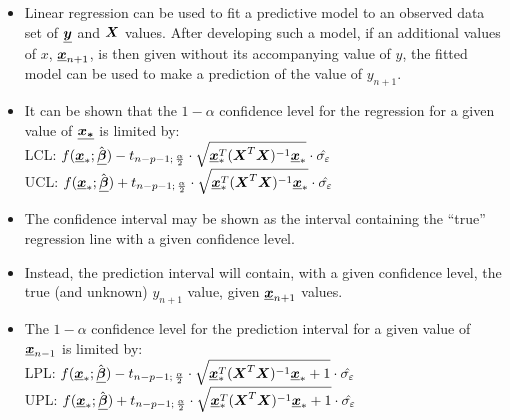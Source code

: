 
\begin{frame}
  \begin{itemize}
    \vspace{0.5cm}
    \item Linear regression can be used to fit a predictive model to an observed data set of $ \boldsymbol{\underline{y}} $ and $ \boldsymbol{X} $ values. After developing such a model, if an additional values of $ x $, $ \boldsymbol{\underline{x}}_{n+1} $, is then given without its accompanying value of $ y $, the fitted model can be used to make a prediction of the value of $ y_{n+1} $.
    \vspace{0.5cm}
    \item It can be shown that the $ 1-\alpha $ confidence level for the regression for a given value of $ \boldsymbol{\underline{x_*}} $ is limited by:\\
      LCL: $f(\boldsymbol{\underline{x}}_*;\hat{\boldsymbol{\underline{\beta}}})-t_{n-p-1;\,\frac{\alpha}{2}}\cdot \sqrt{\boldsymbol{\underline{x}}_*^T(\boldsymbol{X}^T\boldsymbol{X})^{-1}\boldsymbol{\underline{x}}_*}\cdot \hat{\sigma_\varepsilon}$ \\
      \vspace*{.1cm}
      UCL: $f(\boldsymbol{\underline{x}}_*;\hat{\boldsymbol{\underline{\beta}}})+t_{n-p-1;\,\frac{\alpha}{2}}\cdot \sqrt{\boldsymbol{\underline{x}}_*^T(\boldsymbol{X}^T\boldsymbol{X})^{-1}\boldsymbol{\underline{x}}_*}\cdot \hat{\sigma_\varepsilon}$ \\
      \vspace*{.1cm}
  \end{itemize}
\end{frame}

\begin{frame}
  \begin{itemize}
    \vspace{0.25cm}
    \item The confidence interval may be shown as the interval containing the ``true'' regression line with a given confidence level.
    \vspace{0.25cm}
    \item Instead, the prediction interval will contain, with a given confidence level, the true (and unknown) $ y_{n+1} $ value, given $ \boldsymbol{\underline{x}}_{n+1} $ values.
    \vspace{0.25cm}
    \item The $ 1-\alpha $ confidence level for the prediction interval for a given value of $ \boldsymbol{\underline{x}}_{n-1} $ is limited by:\\
      LPL: $f(\boldsymbol{\underline{x}}_*;\hat{\boldsymbol{\underline{\beta}}})-t_{n-p-1;\,\frac{\alpha}{2}}\cdot \sqrt{\boldsymbol{\underline{x}}_*^T(\boldsymbol{X}^T\boldsymbol{X})^{-1}\boldsymbol{\underline{x}}_*+1}\cdot \hat{\sigma_\varepsilon}$ \\
      \vspace*{.1cm}
      UPL: $f(\boldsymbol{\underline{x}}_*;\hat{\boldsymbol{\underline{\beta}}})+t_{n-p-1;\,\frac{\alpha}{2}}\cdot \sqrt{\boldsymbol{\underline{x}}_*^T(\boldsymbol{X}^T\boldsymbol{X})^{-1}\boldsymbol{\underline{x}}_*+1}\cdot \hat{\sigma_\varepsilon}$ \\
      \vspace*{.1cm}
  \end{itemize}
\end{frame}



